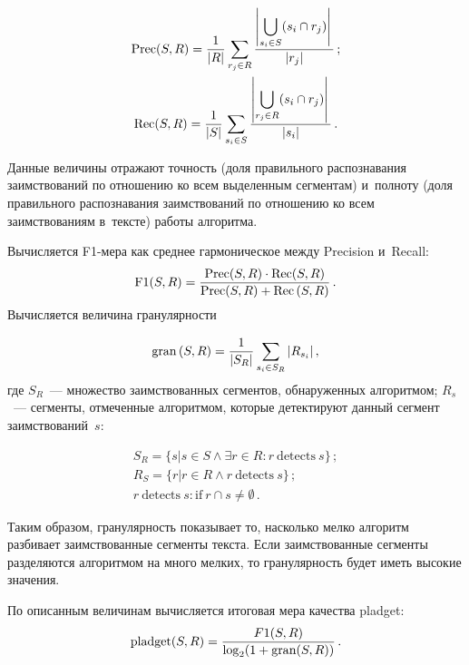 \begin{multicols}{2}
\noindent
\begin{gather*}
\text{Prec}(S,R)=\displaystyle\frac{\displaystyle 1\mathstrut}{\displaystyle |R|\mathstrut}\sum\limits_{r_j\in 
R}\displaystyle\frac{\displaystyle \left\vert \bigcup\limits_{s_i\in S}(s_i\cap r_j)\right\vert\mathstrut}{\displaystyle |r_j|\mathstrut}\,;\\ 
\text{Rec}(S,R)=\displaystyle\frac{\displaystyle 1\mathstrut}{\displaystyle |S|\mathstrut}\sum\limits_{s_i\in S}\displaystyle\frac{\displaystyle \left\vert
\bigcup\limits_{r_j\in 
R}(s_i\cap r_j)\right\vert\mathstrut}{\displaystyle |s_i|\mathstrut}\,.
\end{gather*}

\noindent
Данные величины отражают точность (доля правильного распознавания заимствований 
по отношению ко всем выделенным сегментам) и~полноту (доля правильного 
распознавания заимствований по отношению ко всем заимствованиям в~тексте) работы 
алгоритма.

Вычисляется {F1-мера} как среднее гармоническое между {Precision} 
и~{Recall}:
$$
\mathrm{F}1(S,R) = \displaystyle\frac{\displaystyle \text{Prec} (S, R) \cdot \text{Rec} (S, R)\mathstrut}{\displaystyle \text{Prec} (S, R) + 
\mathrm{Rec}\, (S, R)\mathstrut}\,.
$$
Вычисляется величина гранулярности

\vspace*{2pt}

\noindent
$$
\mathrm{gran}\,(S,R)=\displaystyle\frac{\displaystyle 1\mathstrut}{\displaystyle |S_R|\mathstrut}\sum\limits_{s_i\in S_R}|R_{s_i}|\,,
$$
где $S_R$~--- множество заимствованных сегментов, обнаруженных алгоритмом; 
$R_s$~--- сегменты, отмеченные алгоритмом, которые детектируют данный сегмент 
заимствований~$s$:

\vspace*{-2pt}

\noindent
\begin{gather*}
S_R = \lbrace s | s \in S \wedge \exists r \in R: r\ \mathrm{detects}\ s \rbrace\,;
\\
R_S = \lbrace r | r \in R  \wedge r\ \mathrm{detects}\ s\rbrace\,;
\\
r\ \mathrm{detects}\ s: \mathrm{if}\ r\cap s \neq \emptyset\,.
\end{gather*}

\vspace*{-2pt}

\noindent
Таким образом, гранулярность показывает то, насколько мелко алгоритм разбивает 
заимствованные сегменты текста. Если заимствованные сегменты разделяются 
алгоритмом на много мелких, то гранулярность будет иметь высокие значения.

По описанным величинам вычисляется итоговая мера качества {pladget}:
$$
\text{pladget}(S,R)=\displaystyle\frac{\displaystyle F1(S,R)\mathstrut}{\displaystyle \log_2 (1+\text{gran}(S,R))\mathstrut}\,.
$$

\vspace*{-10pt}


\end{multicols}
